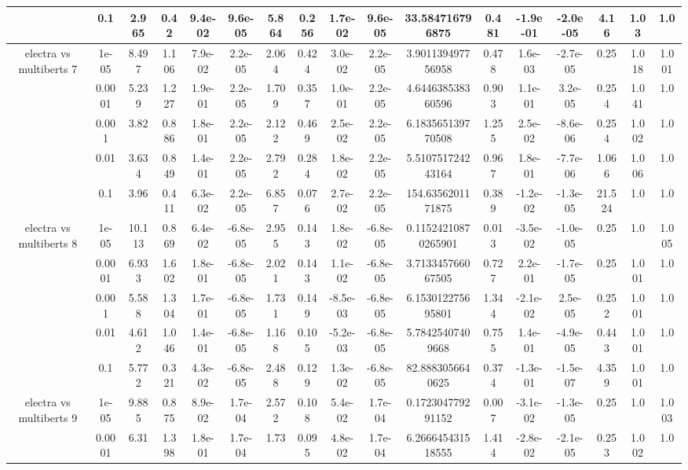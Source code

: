 \begin{tabular}{|c|c|c|c|c|c|c|c|c|c|c|c|c|c|c|c|c|}
 & 0.1 & 2.965 & 0.42 & 9.4e-02 & 9.6e-05 & 5.864 & 0.256 & 1.7e-02 & 9.6e-05 & 33.584716796875 & 0.481 & -1.9e-01 & -2.0e-05 & 4.16 & 1.03 & 1.0 \\
\hline
\multirow{5}{*}{electra  vs multiberts 7} & 1e-05 & 8.497 & 1.106 & 7.9e-02 & 2.2e-05 & 2.064 & 0.424 & 3.0e-02 & 2.2e-05 & 3.901139497756958 & 0.478 & 1.6e-03 & -2.7e-05 & 0.25 & 1.018 & 1.001 \\
 & 0.0001 & 5.239 & 1.227 & 1.9e-01 & 2.2e-05 & 1.709 & 0.357 & 1.0e-01 & 2.2e-05 & 4.644638538360596 & 0.903 & 1.1e-01 & 3.2e-05 & 0.254 & 1.041 & 1.0 \\
 & 0.001 & 3.82 & 0.886 & 1.8e-01 & 2.2e-05 & 2.122 & 0.469 & 2.5e-02 & 2.2e-05 & 6.183565139770508 & 1.255 & 2.5e-02 & -8.6e-06 & 0.254 & 1.002 & 1.0 \\
 & 0.01 & 3.634 & 0.849 & 1.4e-01 & 2.2e-05 & 2.792 & 0.284 & 1.8e-02 & 2.2e-05 & 5.510751724243164 & 0.967 & 1.8e-01 & -7.7e-06 & 1.066 & 1.006 & 1.0 \\
 & 0.1 & 3.96 & 0.411 & 6.3e-02 & 2.2e-05 & 6.857 & 0.076 & 2.7e-02 & 2.2e-05 & 154.6356201171875 & 0.389 & -1.2e-02 & -1.3e-05 & 21.524 & 1.0 & 1.0 \\
\hline
\multirow{5}{*}{electra  vs multiberts 8} & 1e-05 & 10.113 & 0.869 & 6.4e-02 & -6.8e-05 & 2.955 & 0.143 & 1.8e-02 & -6.8e-05 & 0.11524210870265901 & 0.013 & -3.5e-02 & -1.0e-05 & 0.25 & 1.0 & 1.005 \\
 & 0.0001 & 6.933 & 1.602 & 1.8e-01 & -6.8e-05 & 2.021 & 0.143 & 1.1e-02 & -6.8e-05 & 3.713345766067505 & 0.727 & 2.2e-01 & -1.7e-05 & 0.25 & 1.001 & 1.0 \\
 & 0.001 & 5.588 & 1.304 & 1.7e-01 & -6.8e-05 & 1.731 & 0.149 & -8.5e-03 & -6.8e-05 & 6.153012275695801 & 1.344 & -2.1e-02 & 2.5e-05 & 0.252 & 1.001 & 1.0 \\
 & 0.01 & 4.612 & 1.046 & 1.4e-01 & -6.8e-05 & 1.168 & 0.105 & -5.2e-03 & -6.8e-05 & 5.78425407409668 & 0.755 & 1.4e-01 & -4.9e-05 & 0.443 & 1.001 & 1.0 \\
 & 0.1 & 5.772 & 0.321 & 4.3e-02 & -6.8e-05 & 2.488 & 0.129 & 1.3e-02 & -6.8e-05 & 82.8883056640625 & 0.374 & -1.3e-01 & -1.5e-07 & 4.359 & 1.001 & 1.0 \\
\hline
\multirow{5}{*}{electra  vs multiberts 9} & 1e-05 & 9.885 & 0.875 & 8.9e-02 & 1.7e-04 & 2.572 & 0.108 & 5.4e-02 & 1.7e-04 & 0.172304779291152 & 0.007 & -3.1e-02 & -1.3e-05 & 0.25 & 1.0 & 1.003 \\
 & 0.0001 & 6.31 & 1.398 & 1.8e-01 & 1.7e-04 & 1.73 & 0.095 & 4.8e-02 & 1.7e-04 & 6.266645431518555 & 1.414 & -2.8e-02 & -2.1e-05 & 0.253 & 1.002 & 1.0 \\

\end{tabular}
